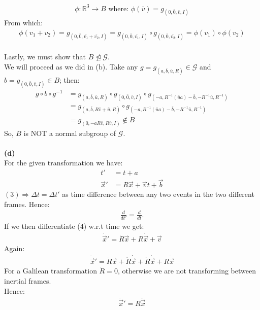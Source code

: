 \documentclass[12pt]{article}
\begin{document}
\begin{align*}
  \phi : \mathbb{R}^3 \to B \text{  where:  } \phi(\bar{v}) = g_{(0, \bar{0}, \bar{v}, I)}
\end{align*}
From which:
\begin{align*}
  \phi(v_1 + v_2) =  g_{(0, \bar{0}, \bar{v_1} + \bar{v_2}, I)} = g_{(0, \bar{0}, \bar{v_1}, I)} \circ g_{(0, \bar{0}, \bar{v_2}, I)} = \phi(v_1) \circ \phi(v_2)
\end{align*}
\\
Lastly, we must show that $B \not\trianglelefteq \mathcal{G}$. \\
We will proceed as we did in (b).  Take any $g=g_{(a, \bar{b}, \bar{u},R)} \in \mathcal{G}$ and $b=g_{(0, \bar{0}, \bar{v}, I)} \in B$; then:
\begin{align*}
   g \circ b \circ g^{-1} &= g_{(a, \bar{b}, \bar{u},R)} \circ g_{(0, \bar{0}, \bar{v}, I)} \circ g_{(-a, R^{-1}(\bar{u}a) - \bar{b}, -R^{-1}\bar{u},R^{-1})} \\
   &= g_{(a, \bar{b}, R\bar{v} + \bar{u},R)} \circ g_{(-a, R^{-1}(\bar{u}a) - \bar{b}, -R^{-1}\bar{u},R^{-1})} \\
   &= g_{(0, -a R \bar{v}, R\bar{v},I)} \notin B
\end{align*}
So, $B$ is NOT a normal subgroup of $\mathcal{G}$. \\
\\
\textbf{(d)}\\
For the given transformation we have:
\begin{align*}
t' &= t+a \tag{3}\\
\vec{x}' &= R\vec{x}+\vec{v}t+\vec{b} \tag{4}
\end{align*}
$(3)\Rightarrow \Delta t=\Delta t'$ as time difference between any two events in the two different frames.
Hence:
\begin{align*}
\frac{d}{dt'}=\frac{d}{dt}.
\end{align*}
If we then differentiate (4) w.r.t time we get:
\begin{align*}
\dot{\vec{x}}'=\dot{R}\vec{x}+R\dot{\vec{x}}+\vec{v}
\end{align*}
Again:
\begin{align*}
\ddot{\vec{x}}'=\ddot{R}\vec{x}+\dot{R}\dot{\vec{x}}+\dot{R}\dot{\vec{x}}+R\ddot{\vec{x}}
\end{align*}
For a Galilean transformation $\dot{R}=0$, otherwise
we are not transforming between inertial frames. \\
Hence:
\begin{align*}
\ddot{\vec{x}}'=R\ddot{\vec{x}} \tag{5}
\end{align*}
\end{document}
